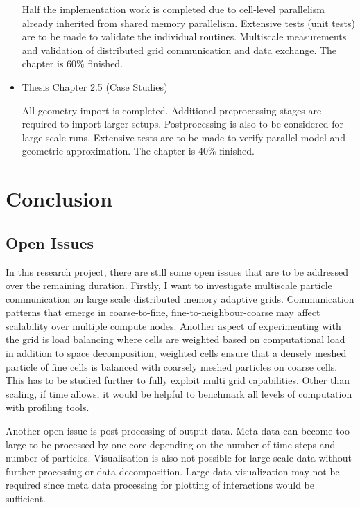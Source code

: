 \documentclass[times,12pt]{article}
\begin{document}
\begin{itemize}
Half the implementation work is completed due to cell-level parallelism already inherited from shared memory parallelism. Extensive tests (unit tests) are to be made to validate the individual routines. Multiscale measurements and validation of distributed grid communication and data exchange. The chapter is 60\% finished.

\item Thesis Chapter 2.5 (Case Studies)

All geometry import is completed. Additional preprocessing stages are required to import larger setups. Postprocessing is also to be considered for large scale runs. Extensive tests are to be made to verify parallel model and geometric approximation. The chapter is 40\% finished.


\end{itemize}

\section{Conclusion}

\subsection{Open Issues}

In this research project, there are still some open issues that are to be addressed over the remaining duration. Firstly, I want to investigate multiscale particle communication on large scale distributed memory adaptive grids. Communication patterns that emerge in coarse-to-fine, fine-to-neighbour-coarse may affect scalability over multiple compute nodes. Another aspect of experimenting with the grid is load balancing where cells are weighted based on computational load in addition to space decomposition, weighted cells ensure that a densely meshed particle of fine cells is balanced with coarsely meshed particles on coarse cells. This has to be studied further to fully exploit multi grid capabilities. Other than scaling, if time allows, it would be helpful to benchmark all levels of computation with profiling tools. 

Another open issue is post processing of output data. Meta-data can become too large to be processed by one core depending on the number of time steps and number of particles. Visualisation is also not possible for large scale data without further processing or data decomposition. Large data visualization may not be required since meta data processing for plotting of interactions would be sufficient. 
\end{document}
